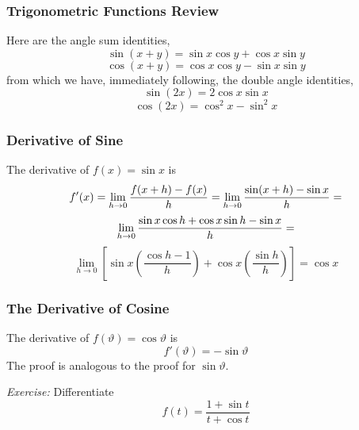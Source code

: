 \documentclass[xcolor=dvipsnames]{beamer}
\begin{document}
\begin{frame}
  \frametitle{Trigonometric Functions Review}
  Here are the angle sum identities,
  \begin{equation}
  \label{eq:eitaiquu}
  \sin(x+y)=\sin{}x\cos{}y+\cos{}x\sin{}y
\end{equation}
\begin{equation}
  \label{eq:iasoojou}
  \cos(x+y)=\cos{}x\cos{}y-\sin{}x\sin{}y
\end{equation}
from which we have, immediately following, the double angle
identities,
  \begin{equation}
    \label{eq:icuchodo}
    \sin(2x)=2\cos{}x\sin{}x
  \end{equation}
  \begin{equation}
    \label{eq:woojahtu}
    \cos(2x)=\cos^{2}x-\sin^{2}x
  \end{equation}
\end{frame}

\begin{frame}
  \frametitle{Derivative of Sine}
  The derivative of $f(x)=\sin{}x$ is 
\begin{equation}
  \label{eq:eishooro}
  f'(x)=\lim_{h\rightarrow{}0}\frac{f(x+h)-f(x)}{h}=\lim_{h\rightarrow{}0}\frac{\sin(x+h)-\sin{}x}{h}=\notag
\end{equation}
\begin{equation}
  \label{eq:phauzelo}
  \lim_{h\rightarrow{}0}\frac{\sin{}x\cos{}h+\cos{}x\sin{}h-\sin{}x}{h}=\notag
\end{equation}
\begin{equation}
  \label{eq:jiexeedo}
  \lim_{h\rightarrow{}0}\left[\sin{}x\left(\frac{\cos{}h-1}{h}\right)+\cos{}x\left(\frac{\sin{}h}{h}\right)\right]=\cos{}x
\end{equation}
\end{frame}

\begin{frame}
  \frametitle{The Derivative of Cosine}
The derivative of $f(\vartheta)=\cos\vartheta$ is 
\begin{equation}
  \label{eq:ahfiefev}
  f'(\vartheta)=-\sin\vartheta
\end{equation}
The proof is analogous to the proof for $\sin{}\vartheta$.

\emph{Exercise:} Differentiate 
\begin{equation}
  \label{eq:afeizeix}
  f(t)=\frac{1+\sin{}t}{t+\cos{}t}
\end{equation}
\end{frame}
\end{document}
